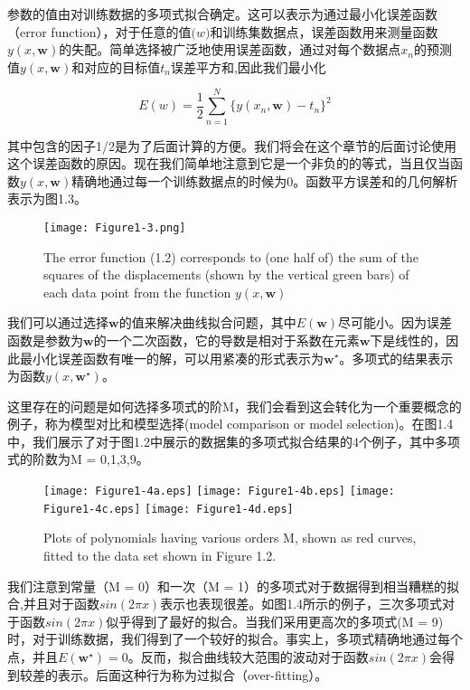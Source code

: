 	参数的值由对训练数据的多项式拟合确定。这可以表示为通过最小化误差函数（error function），对于任意的值$\mathbf(w)$和训练集数据点，误差函数用来测量函数$y(x,\mathbf{w})$的失配。简单选择被广泛地使用误差函数，通过对每个数据点$x_n$的预测值$y(x,\mathbf{w})$和对应的目标值$t_n$误差平方和,因此我们最小化
	
	\begin{equation}
	E(w) = \frac{1}{2} \sum_{n = 1}^{N}\{ y(x_n,\mathbf{w}) - t_n\}^2
	\end{equation}
	
	其中包含的因子1/2是为了后面计算的方便。我们将会在这个章节的后面讨论使用这个误差函数的原因。现在我们简单地注意到它是一个非负的的等式，当且仅当函数$y(x,\mathbf{w})$精确地通过每一个训练数据点的时候为0。函数平方误差和的几何解析表示为图1.3。
	
	
\begin{figure}
	\parbox{.4\textwidth}{\caption{The error function (1.2) corresponds to (one half of) the sum of the squares of the displacements (shown by the vertical green bars) of each data point from the function $y(x,\mathbf{w})$ } }
	\parbox{.5\textwidth}{\texttt{[image: Figure1-3.png]}}
	\label{fig:endb-flow} 
\end{figure}

	我们可以通过选择$\mathbf{w}$的值来解决曲线拟合问题，其中$E(\mathbf{w})$尽可能小。因为误差函数是参数为$\mathbf{w}$的一个二次函数，它的导数是相对于系数在元素$\mathbf{w}$下是线性的，因此最小化误差函数有唯一的解，可以用紧凑的形式表示为$\mathbf{w}^{\star}$。多项式的结果表示为函数$y(x,\mathbf{w}^{\star})$。
	
	这里存在的问题是如何选择多项式的阶M，我们会看到这会转化为一个重要概念的例子，称为模型对比和模型选择(model comparison or model selection)。在图1.4中，我们展示了对于图1.2中展示的数据集的多项式拟合结果的4个例子，其中多项式的阶数为M = 0,1,3,9。

\begin{figure}[t]
	
	\texttt{[image: Figure1-4a.eps]}
	\texttt{[image: Figure1-4b.eps]}
	\texttt{[image: Figure1-4c.eps]}
	\texttt{[image: Figure1-4d.eps]}
	\caption{Plots of polynomials having various orders M, shown as red curves, fitted to the data set shown in
		Figure 1.2. } 
\end{figure}

	我们注意到常量（M = 0）和一次（M = 1）的多项式对于数据得到相当糟糕的拟合,并且对于函数$sin(2 \pi x)$表示也表现很差。如图1.4所示的例子，三次多项式对于函数$sin(2 \pi x)$似乎得到了最好的拟合。当我们采用更高次的多项式(M = 9)时，对于训练数据，我们得到了一个较好的拟合。事实上，多项式精确地通过每个点，并且$E(\mathbf{w}^{\star}) = 0$。反而，拟合曲线较大范围的波动对于函数$sin(2 \pi x)$会得到较差的表示。后面这种行为称为过拟合（over-fitting）。
	
